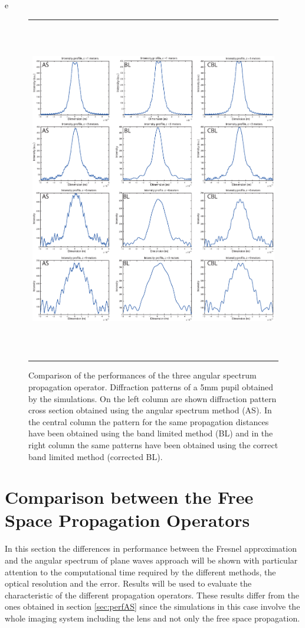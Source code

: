 e 
 \begin{figure}[H]
 	\begin{center}
 		\begin{tabular}{c}
 			\includegraphics[height=15cm]{methods1.eps}
 		\end{tabular}
 	\end{center}
 	\caption{ \label{fig:methods} 
 		Comparison of the performances of the three angular spectrum propagation operator. Diffraction patterns of a 5mm pupil obtained by the simulations. On the left column are shown diffraction pattern cross section obtained using the angular spectrum method (AS). In the central column the pattern for the same propagation distances have been obtained using the band limited method (BL) and in the right column the same patterns have been obtained using the correct band limited method (corrected BL). }
 \end{figure}
 
 \section{Comparison between the Free Space Propagation Operators}
 \label{sec:comp}
	 In this section the differences in performance between the Fresnel approximation and the angular spectrum of plane waves approach will be shown with particular attention to the computational time required by the different methods, the optical resolution and the error. Results will be used to evaluate the characteristic of the different propagation operators. These results differ from the ones obtained in section \ref{sec:perfAS} since the simulations in this case involve the whole imaging system including the lens and not only the free space propagation.
